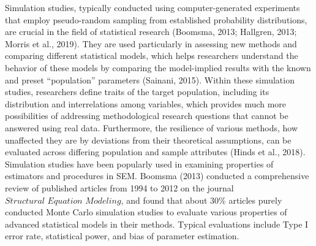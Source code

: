 \documentclass[
  11pt,
  man]{apa6}
\begin{document}
Simulation studies, typically conducted using computer-generated experiments that employ pseudo-random sampling from established probability distributions, are crucial in the field of statistical research (Boomsma, 2013; Hallgren, 2013; Morris et al., 2019). They are used particularly in assessing new methods and comparing different statistical models, which helps researchers understand the behavior of these models by comparing the model-implied results with the known and preset ``population'' parameters (Sainani, 2015). Within these simulation studies, researchers define traits of the target population, including its distribution and interrelations among variables, which provides much more possibilities of addressing methodological research questions that cannot be answered using real data. Furthermore, the resilience of various methods, how unaffected they are by deviations from their theoretical assumptions, can be evaluated across differing population and sample attributes (Hinds et al., 2018). Simulation studies have been popularly used in examining properties of estimators and procedures in SEM. Boomsma (2013) conducted a comprehensive review of published articles from 1994 to 2012 on the journal \(\textit{Structural Equation Modeling}\), and found that about 30\% articles purely conducted Monte Carlo simulation studies to evaluate various properties of advanced statistical models in their methods. Typical evaluations include Type I error rate, statistical power, and bias of parameter estimation.
\end{document}
